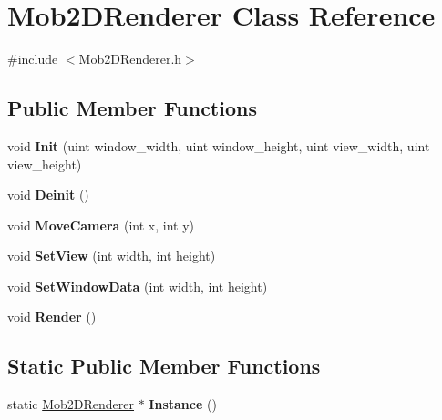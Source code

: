 \hypertarget{classMob2DRenderer}{
\section{Mob2DRenderer Class Reference}
\label{classMob2DRenderer}
}


{\ttfamily \#include $<$Mob2DRenderer.h$>$}\subsection*{Public Member Functions}
\begin{DoxyCompactItemize}
\item 
\hypertarget{classMob2DRenderer_a4c89702ab1b8682ce23a3e89da0670c5}{
void {\bfseries Init} (uint window\_\-width, uint window\_\-height, uint view\_\-width, uint view\_\-height)}
\label{classMob2DRenderer_a4c89702ab1b8682ce23a3e89da0670c5}

\item 
\hypertarget{classMob2DRenderer_ad9b187b3a21944c6ae67d691c17979ef}{
void {\bfseries Deinit} ()}
\label{classMob2DRenderer_ad9b187b3a21944c6ae67d691c17979ef}

\item 
\hypertarget{classMob2DRenderer_ae840203c037d0a4d34d2d25f6b2355ff}{
void {\bfseries MoveCamera} (int x, int y)}
\label{classMob2DRenderer_ae840203c037d0a4d34d2d25f6b2355ff}

\item 
\hypertarget{classMob2DRenderer_a237fc6126a5b08a0565cdb1d5186f01a}{
void {\bfseries SetView} (int width, int height)}
\label{classMob2DRenderer_a237fc6126a5b08a0565cdb1d5186f01a}

\item 
\hypertarget{classMob2DRenderer_ade1f82be52046c3c7b0fe7e06c3bf50e}{
void {\bfseries SetWindowData} (int width, int height)}
\label{classMob2DRenderer_ade1f82be52046c3c7b0fe7e06c3bf50e}

\item 
\hypertarget{classMob2DRenderer_a39a0942d3ad45f5e1e89a1e72fe16298}{
void {\bfseries Render} ()}
\label{classMob2DRenderer_a39a0942d3ad45f5e1e89a1e72fe16298}

\end{DoxyCompactItemize}
\subsection*{Static Public Member Functions}
\begin{DoxyCompactItemize}
\item 
\hypertarget{classMob2DRenderer_afa16f8b42c58b89c1c294f08054b52fd}{
static \hyperlink{classMob2DRenderer}{Mob2DRenderer} $\ast$ {\bfseries Instance} ()}
\label{classMob2DRenderer_afa16f8b42c58b89c1c294f08054b52fd}

\end{DoxyCompactItemize}
